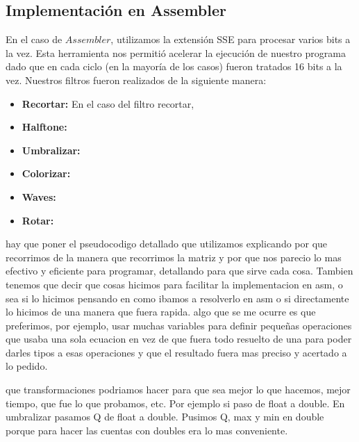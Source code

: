 \documentclass[10pt, a4paper]{article}
\begin{document}
\subsection{Implementación en Assembler}
En el caso de $Assembler$, utilizamos la extensión SSE para procesar varios bits a la vez. Esta herramienta nos permitió acelerar la ejecución de nuestro programa dado que en cada ciclo (en la mayoría de los casos) fueron tratados 16 bits a la vez.\newline
Nuestros filtros fueron realizados de la siguiente manera:
\begin{itemize}
\item {\textbf{Recortar:}}
En el caso del filtro recortar, 
\item {\textbf{Halftone:}}
\item {\textbf{Umbralizar:}}
\item {\textbf{Colorizar:}} 
\item {\textbf{Waves:}} 
\item {\textbf{Rotar:}} 

\end{itemize}

hay que poner el pseudocodigo detallado que utilizamos explicando por que recorrimos de la manera que recorrimos la matriz y por que nos parecio lo mas efectivo y eficiente para programar, detallando para que sirve cada cosa. Tambien tenemos que decir que cosas hicimos para facilitar la implementacion en asm, o sea si lo hicimos pensando en como ibamos a resolverlo en asm o si directamente lo hicimos de una manera que fuera rapida. algo que se me ocurre es que preferimos, por ejemplo, usar muchas variables para definir pequeñas operaciones que usaba una sola ecuacion en vez de que fuera todo resuelto de una para poder darles tipos a esas operaciones y que el resultado fuera mas preciso y acertado a lo pedido.\newline

que transformaciones podriamos hacer para que sea mejor lo que hacemos, mejor tiempo, que fue lo que probamos, etc. Por ejemplo si paso de float a double. En umbralizar pasamos Q de float a double. Pusimos Q, max y min en double porque para hacer las cuentas con doubles era lo mas conveniente.
\newline
\end{document}
